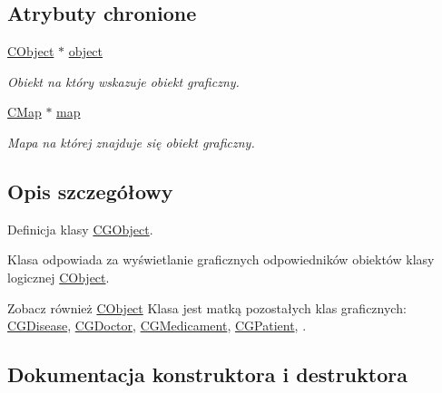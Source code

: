 \subsection*{Atrybuty chronione}
\begin{DoxyCompactItemize}
\item 
\mbox{\hyperlink{class_c_object}{C\+Object}} $\ast$ \mbox{\hyperlink{class_c_g_object_a8955574357e33ce28957c4ff42154cfb}{object}}
\begin{DoxyCompactList}\small\item\em Obiekt na który wskazuje obiekt graficzny. \end{DoxyCompactList}\item 
\mbox{\hyperlink{class_c_map}{C\+Map}} $\ast$ \mbox{\hyperlink{class_c_g_object_a8cfd8e7d917cd445ea8f5284f709452d}{map}}
\begin{DoxyCompactList}\small\item\em Mapa na której znajduje się obiekt graficzny. \end{DoxyCompactList}\end{DoxyCompactItemize}


\subsection{Opis szczegółowy}
Definicja klasy \mbox{\hyperlink{class_c_g_object}{C\+G\+Object}}. 

Klasa odpowiada za wyświetlanie graficznych odpowiedników obiektów klasy logicznej \mbox{\hyperlink{class_c_object}{C\+Object}}.
\begin{DoxyItemize}
\item \begin{DoxySeeAlso}{Zobacz również}
\mbox{\hyperlink{class_c_object}{C\+Object}} Klasa jest matką pozostałych klas graficznych\+: \mbox{\hyperlink{class_c_g_disease}{C\+G\+Disease}}, \mbox{\hyperlink{class_c_g_doctor}{C\+G\+Doctor}}, \mbox{\hyperlink{class_c_g_medicament}{C\+G\+Medicament}}, \mbox{\hyperlink{class_c_g_patient}{C\+G\+Patient}}, . 
\end{DoxySeeAlso}

\end{DoxyItemize}

\subsection{Dokumentacja konstruktora i destruktora}
\mbox{\label{class_c_g_object_a40a7f41342b3b791a8854b3397378d5d}} 
